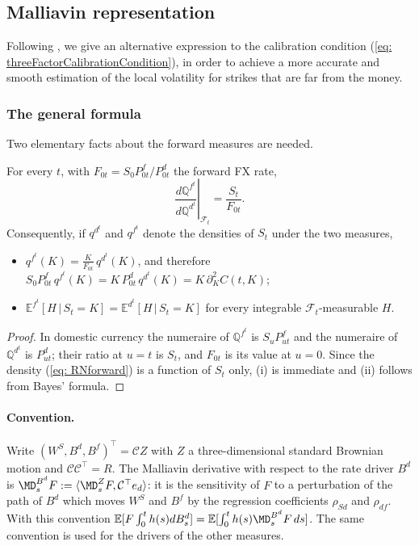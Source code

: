 \subsection{Malliavin representation}\label{subsec: malliavin3F}
Following \cite{guyonLabordere}, we give an alternative expression to the calibration condition (\ref{eq: threeFactorCalibrationCondition}), in order to achieve a more accurate and smooth estimation of the local volatility for strikes that are far from the money.

\subsubsection{The general formula}
Two elementary facts about the forward measures are needed.
\begin{lem}\label{lem: forwardMeasures}
For every $t$, with $F_{0t}=S_0P^f_{0t}/P^d_{0t}$ the forward FX rate,
\begin{equation}\label{eq: RNforward}
\left.\frac{d\mathbb{Q}^{f^t}}{d\mathbb{Q}^{d^t}}\right|_{\mathcal{F}_t}=\frac{S_t}{F_{0t}} .
\end{equation}
Consequently, if $q^{d^t}$ and $q^{f^t}$ denote the densities of $S_t$ under the two measures,
\begin{itemize}
\item[(i)] $q^{f^t}(K)=\frac{K}{F_{0t}}\,q^{d^t}(K)$, and therefore $S_0P^f_{0t}\,q^{f^t}(K)=K\,P^d_{0t}\,q^{d^t}(K)=K\,\partial_K^2C(t,K)$;
\item[(ii)] $\mathbb{E}^{f^t}[H\,|\,S_t=K]=\mathbb{E}^{d^t}[H\,|\,S_t=K]$ for every integrable $\mathcal{F}_t$-measurable $H$.
\end{itemize}
\end{lem}
\begin{proof}
In domestic currency the numeraire of $\mathbb{Q}^{f^t}$ is $S_uP^f_{ut}$ and the numeraire of $\mathbb{Q}^{d^t}$ is $P^d_{ut}$; their ratio at $u=t$ is $S_t$, and $F_{0t}$ is its value at $u=0$. Since the density (\ref{eq: RNforward}) is a function of $S_t$ only, (i) is immediate and (ii) follows from Bayes' formula.
\end{proof}

\paragraph{Convention.} Write $(W^S,B^d,B^f)^\top=\mathcal{C}Z$ with $Z$ a three-dimensional standard Brownian motion and $\mathcal{C}\mathcal{C}^\top=R$. The Malliavin derivative with respect to the rate driver $B^d$ is $\MD^{B^d}_sF:=\langle \MD^Z_sF,\mathcal{C}^\top e_d\rangle$: it is the sensitivity of $F$ to a perturbation of the path of $B^d$ which moves $W^S$ and $B^f$ by the regression coefficients $\rho_{Sd}$ and $\rho_{df}$. With this convention $\mathbb{E}[F\int_0^th(s)dB^d_s]=\mathbb{E}[\int_0^th(s)\MD^{B^d}_sF\,ds]$. The same convention is used for the drivers of the other measures.

